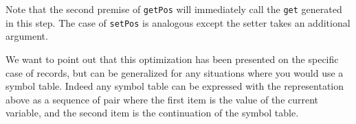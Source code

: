 \noindent
Note that the second premise of \texttt{getPos} will immediately call the \texttt{get} generated in this step. The case of \texttt{setPos} is analogous except the setter takes an additional argument.

We want to point out that this optimization has been presented on the specific case of records, but can be generalized for any situations where you would use a symbol table. Indeed any symbol table can be expressed with the representation above as a sequence of pair where the first item is the value of the current variable, and the second item is the continuation of the symbol table.
